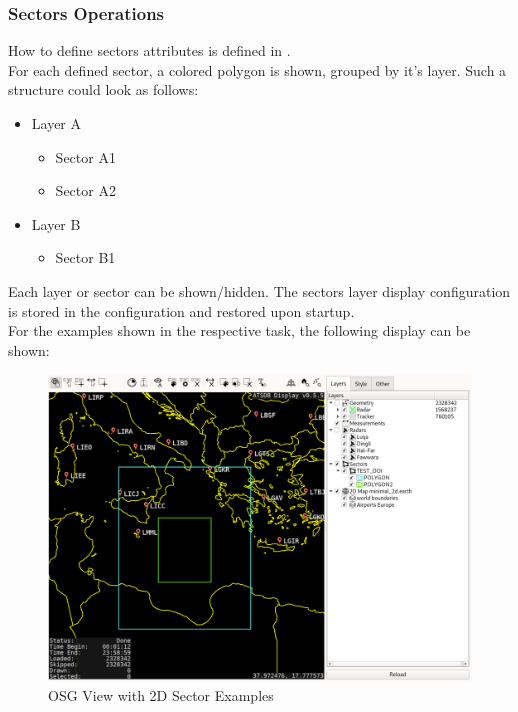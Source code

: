 \subsubsection{Sectors Operations}
\label{sec:osg_sectors_ops}  

How to define sectors attributes is defined in . \\

For each defined sector, a colored polygon is shown, grouped by it's layer. Such a structure could look as follows:

\begin{itemize}
 \item Layer A
 \begin{itemize}
 \item Sector A1
 \item Sector A2
\end{itemize} 
 \item Layer B
  \begin{itemize}
 \item Sector B1
\end{itemize} 
\end{itemize}

Each layer or sector can be shown/hidden. The sectors layer display configuration is stored in the configuration and restored upon startup. \\

For the examples shown in the respective task, the following display can be shown:

\begin{figure}[H]
    \hspace*{-2.5cm}
    \includegraphics[width=19cm]{figures/osgview_sectors2d.png}
  \caption{OSG View with 2D Sector Examples}
\end{figure}

